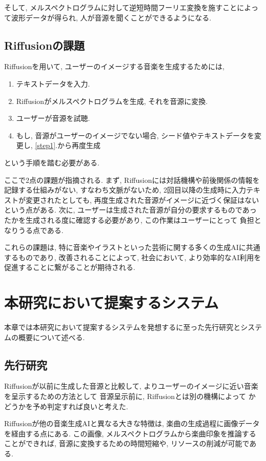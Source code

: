 \documentclass[a4paper,11pt,dvipdfmx]{jreport}
\begin{document}
そして, メルスペクトログラムに対して逆短時間フーリエ変換を施すことによって波形データが得られ, 
人が音源を聞くことができるようになる.

\newpage
\section{Riffusionの課題}
Riffusionを用いて, ユーザーのイメージする音楽を生成するためには, 
\begin{enumerate}
  \item テキストデータを入力.\label{step1}
  \item Riffusionがメルスペクトログラムを生成, それを音源に変換.
  \item ユーザーが音源を試聴.
  \item もし, 音源がユーザーのイメージでない場合, シード値やテキストデータを変更し, \ref{step1}.から再度生成
\end{enumerate}
という手順を踏む必要がある.

ここで2点の課題が指摘される.
まず, Riffusionには対話機構や前後関係の情報を記録する仕組みがない, すなわち文脈がないため, 2回目以降の生成時に入力テキストが変更されたとしても,
再度生成された音源がイメージに近づく保証はないという点がある.
次に, ユーザーは生成された音源が自分の要求するものであったかを生成される度に確認する必要があり, この作業はユーザーにとって
負担となりうる点である.

これらの課題は, 特に音楽やイラストといった芸術に関する多くの生成AIに共通するものであり, 
改善されることによって, 社会において, より効率的なAI利用を促進することに繋がることが期待される.

\newpage
\chapter{本研究において提案するシステム}
本章では本研究において提案するシステムを発想するに至った先行研究とシステムの概要について述べる.
\section{先行研究}
Riffusionが以前に生成した音源と比較して, よりユーザーのイメージに近い音楽を呈示するための方法として
音源呈示前に, Riffusionとは別の機構によって
かどうかを予め判定すれば良いと考えた.

Riffusionが他の音楽生成AIと異なる大きな特徴は, 楽曲の生成過程に画像データを経由する点にある.
この画像, メルスペクトログラムから楽曲印象を推論することができれば, 
音源に変換するための時間短縮や, リソースの削減が可能である.
\end{document}
